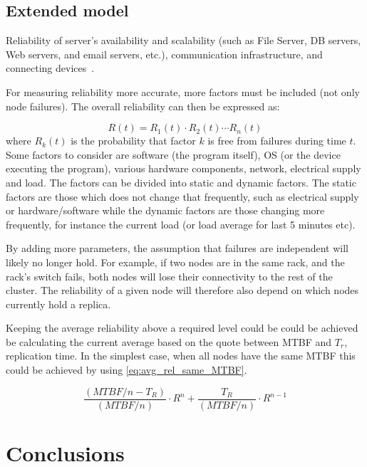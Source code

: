 \documentclass{cslthse-msc}
\begin{document}
\section{Extended model} \label{subsec:future_extended_model}
Reliability of server’s availability and scalability (such as File Server, DB servers, Web servers, and email servers, etc.), communication infrastructure, and connecting devices~\cite{surveyReliabilityDistr}.

For measuring reliability more accurate, more factors must be included (not only node failures). The overall reliability can then be expressed as:

\begin{equation} \label{eq:overall_reliability}
R(t) = R_{1}(t) \cdot R_{2}(t) \cdots R_{n}(t)
\end{equation}
where $R_{k}(t)$ is the probability that factor $k$ is free from failures during time $t$. Some factors to consider are software (the program itself), OS (or the device executing the program), various hardware components, network, electrical supply and load. The factors can be divided into static and dynamic factors. The static factors are those which does not change that frequently, such as electrical supply or hardware/software while the dynamic factors are those changing more frequently, for instance the current load (or load average for last 5 minutes etc). 

By adding more parameters, the assumption that failures are independent will likely no longer hold. For example, if two nodes are in the same rack, and the rack's switch fails, both nodes will lose their connectivity to the rest of the cluster. The reliability of a given node will therefore also depend on which nodes currently hold a replica.

Keeping the average reliability above a required level could be could be achieved be calculating the current average based on the quote between MTBF and \emph{$T_r$}, replication time.
In the simplest case, when all nodes have the same MTBF this could be achieved by using \cref{eq:avg_rel_same_MTBF}.

\begin{equation} \label{eq:avg_rel_same_MTBF}
	\frac{(MTBF/n - T_{R})}{(MTBF/n)} \cdot R^n + \frac{T_{R}}{(MTBF/n)} \cdot R^{n-1}
\end{equation}

\chapter{Conclusions} \label{ch:conclusions}
\end{document}
